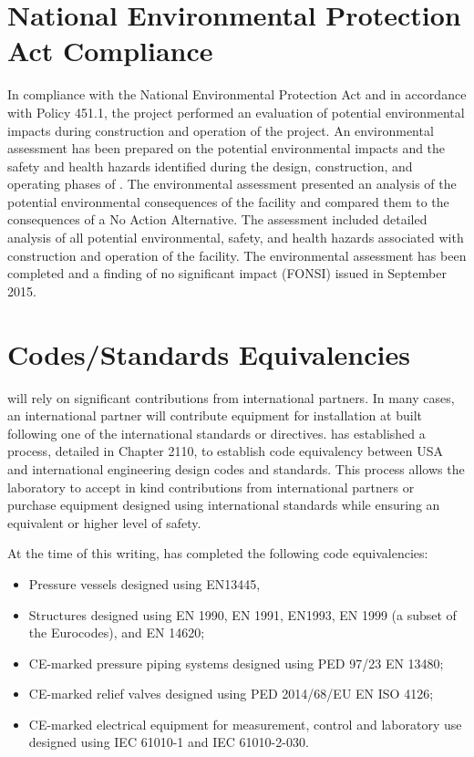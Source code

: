 \section{National Environmental Protection Act Compliance}

In compliance with the National Environmental Protection Act and in
accordance with  Policy 451.1, the
 project performed an evaluation of potential
environmental impacts during construction and operation of the
project.  An environmental assessment has been prepared on the
potential environmental impacts and the safety and health hazards
identified during the design, construction, and operating phases of
.  The environmental assessment presented an
analysis of the potential environmental consequences of the facility
and compared them to the consequences of a No Action Alternative. The
assessment included detailed analysis of all potential environmental,
safety, and health hazards associated with construction and operation
of the facility.  The environmental assessment has been completed and
a finding of no significant impact (FONSI) issued in September 2015.

\section{Codes/Standards Equivalencies}
\label{sec:esh_codes}

 will rely on significant contributions from international
partners. In many cases, an international partner will contribute
equipment for installation at  built following one of the
international standards or directives.  has established a
process, detailed in  Chapter 2110, to establish code
equivalency between USA and international engineering design codes
and standards. This process allows the laboratory to accept in kind
contributions from international partners or purchase equipment
designed using international standards while ensuring an equivalent or
higher level of safety.

At the time of this writing, \fnal has completed the following code
equivalencies:
\begin{itemize}
 \item Pressure vessels designed using EN13445,
 \item Structures designed using EN 1990, EN 1991, EN1993, EN 1999 (a
   subset of the Eurocodes), and EN 14620;
 \item CE-marked pressure piping systems designed using PED 97/23 EN 13480;
 \item CE-marked relief valves designed using PED 2014/68/EU EN ISO 4126;
 \item CE-marked electrical equipment for measurement, control and
   laboratory use designed using IEC 61010-1 and IEC 61010-2-030.
\end{itemize}

